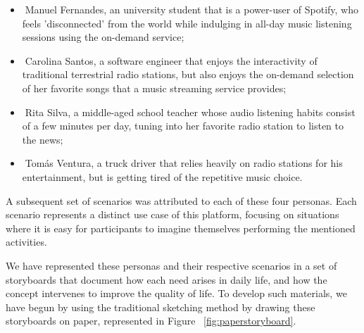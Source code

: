 \begin{itemize}
	\item \textbf{Manuel Fernandes}, an university student that is a power-user of Spotify, who feels 'disconnected' from the world while indulging in all-day music listening sessions using the on-demand service;
	\item \textbf{Carolina Santos}, a software engineer that enjoys the interactivity of traditional terrestrial radio stations, but also enjoys the on-demand selection of her favorite songs that a music streaming service provides;
	\item \textbf{Rita Silva}, a middle-aged school teacher whose audio listening habits consist of a few minutes per day, tuning into her favorite radio station to listen to the news;
	\item \textbf{Tomás Ventura}, a truck driver that relies heavily on radio stations for his entertainment, but is getting tired of the repetitive music choice.
\end{itemize}


A subsequent set of scenarios was attributed to each of these four personas. Each scenario represents a distinct use case of this platform, focusing on situations where it is easy for participants to imagine themselves performing the mentioned activities.

We have represented these personas and their respective scenarios in a set of storyboards that document how each need arises in daily life, and how the concept intervenes to improve the quality of life. To develop such materials, we have begun by using the traditional sketching method by drawing these storyboards on paper, represented in Figure ~\ref{fig:paperstoryboard}.

